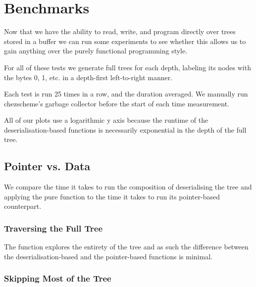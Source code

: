 


\section{Benchmarks}\label{sec:timing}

Now that we have the ability to read, write, and program directly
over trees stored in a buffer we can run some experiments to see
whether this allows us to gain anything over the purely functional
programming style.

For all of these tests we generate full trees for each depth,
labeling its nodes with the bytes 0, 1, etc. in a depth-first
left-to-right manner.

Each test is run 25 times in a row, and the duration averaged.
%
We manually run chezscheme's garbage collector before the start of
each time measurement.

All of our plots use a logarithmic y axis because the runtime of the
deserialisation-based functions is necessarily exponential in the depth
of the full tree.


\subsection{Pointer vs. Data}

We compare the time it takes to run the composition of deserialising
the tree and applying the pure function to the time it takes to run
its pointer-based counterpart.

\subsubsection{Traversing the Full Tree}

The  function explores the entirety of the tree
and as such the difference between the deserialisation-based and the
pointer-based functions is minimal.

\noindent
\begin{minipage}{.5\textwidth}
\end{minipage}\hfill
\begin{minipage}{.45\textwidth}
\end{minipage}

\subsubsection{Skipping Most of the Tree}

